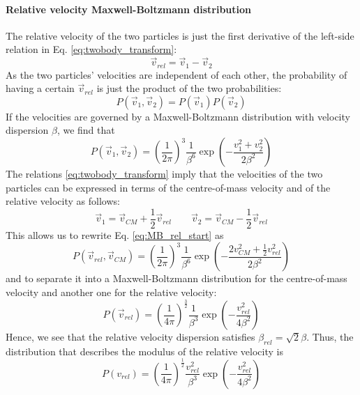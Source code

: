 \begin{appendices}
\paragraph{Relative velocity Maxwell-Boltzmann distribution}
The relative velocity of the two particles is just the first derivative of the left-side relation in Eq. \eqref{eq:twobody_transform}:
\begin{equation}
	\vec{v}_{rel} = \vec{v}_1 - \vec{v}_2
\end{equation}
As the two particles' velocities are independent of each other, the probability of having a certain \(\vec{v}_{rel} \) is just the product of the two probabilities:
\begin{equation}
	P(\vec{v}_1, \vec{v}_2) = P(\vec{v}_1)P(\vec{v}_2)
\end{equation}
If the velocities are governed by a Maxwell-Boltzmann distribution with velocity dispersion \(\beta \), we find that
\begin{equation}\label{eq:MB_rel_start}
	P(\vec{v}_1, \vec{v}_2) = \left( \frac{1}{2\pi } \right)^3 \frac{1}{\beta ^6} \exp \left( -\frac{v_1^2 + v_2^2}{2\beta ^2} \right)  
\end{equation}
The relations \eqref{eq:twobody_transform} imply that the velocities of the two particles can be expressed in terms of the centre-of-mass velocity and of the relative velocity as follows:
\begin{equation}
	\vec{v}_1 = \vec{v}_{CM} + \frac{1}{2} \vec{v}_{rel}
	\qquad
	\vec{v}_2 = \vec{v}_{CM} - \frac{1}{2} \vec{v}_{rel} 
\end{equation}
This allows us to rewrite Eq. \eqref{eq:MB_rel_start} as
\begin{equation}
	P(\vec{v}_{rel} , \vec{v}_{CM} ) = \left( \frac{1}{2\pi } \right)^3 \frac{1}{\beta ^6} \exp \left( - \frac{2 v_{CM} ^2 + \frac{1}{2}v_{rel} ^2}{2\beta ^2} \right)  
\end{equation}
and to separate it into a Maxwell-Boltzmann distribution for the centre-of-mass velocity and another one for the relative velocity:
\begin{equation}
	P(\vec{v}_{rel} ) = \left( \frac{1}{4\pi } \right)^{\frac{3}{2}} \frac{1}{\beta ^3} \exp \left( - \frac{v_{rel} ^2}{4\beta ^2} \right)  
\end{equation}
Hence, we see that the relative velocity dispersion satisfies \(\beta _{rel}=\sqrt{2} \beta \). Thus, the distribution that describes the modulus of the relative velocity is
\begin{equation}
	P(v_{rel} ) = \left( \frac{1}{4\pi } \right) ^{\frac{1}{2}} \frac{v_{rel} ^2}{\beta ^3} \exp \left( - \frac{v_{rel} ^2}{4\beta ^2} \right)  
\end{equation}

\end{appendices}